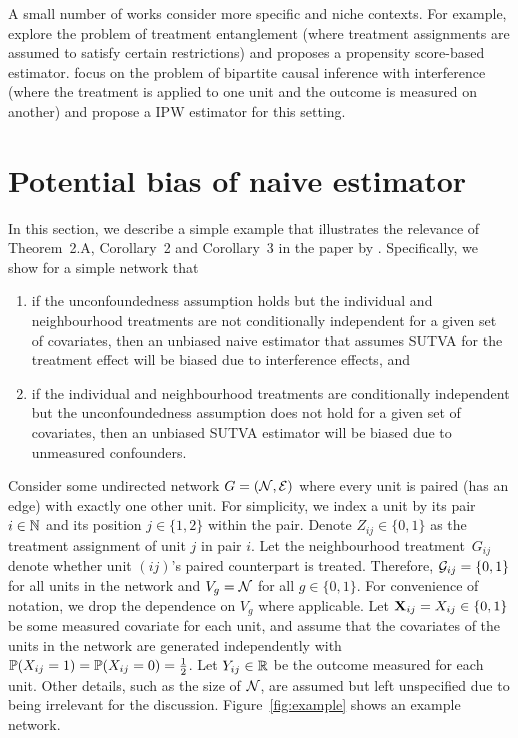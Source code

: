 \documentclass[10pt]{article}
\begin{document}
A small number of works consider more specific and niche contexts. For example, \textcite{Toulis:2018} explore the problem of treatment entanglement (where treatment assignments are assumed to satisfy certain restrictions) and proposes a propensity score-based estimator. \textcite{Zigler:2021} focus on the problem of bipartite causal inference with interference (where the treatment is applied to one unit and the outcome is measured on another) and propose a IPW estimator for this setting.



\section{Potential bias of naive estimator}\label{sec:example}

In this section, we describe a simple example that illustrates the relevance of Theorem~2.A, Corollary~2 and Corollary~3 in the paper by \textcite{Forastiere:2021}. Specifically, we show for a simple network that
\begin{enumerate}

\item
if the unconfoundedness assumption holds but the individual and neighbourhood treatments are not conditionally independent for a given set of covariates, then an unbiased naive estimator that assumes SUTVA for the treatment effect will be biased due to interference effects, and

\item
if the individual and neighbourhood treatments are conditionally independent but the unconfoundedness assumption does not hold for a given set of covariates, then an unbiased SUTVA estimator will be biased due to unmeasured confounders.

\end{enumerate}

Consider some undirected network $G=(\calN,\calE)$ where every unit is paired (has an edge) with exactly one other unit. For simplicity, we index a unit by its pair $i\in\bbN$ and its position $j\in\{1,2\}$ within the pair. Denote $Z_{ij}\in\{0,1\}$ as the treatment assignment of unit $j$ in pair $i$. Let the neighbourhood treatment~$G_{ij}$ denote whether unit $(ij)$'s paired counterpart is treated. Therefore, $\calG_{ij}=\{0,1\}$ for all units in the network and $V_g=\calN$ for all $g\in\{0,1\}$. For convenience of notation, we drop the dependence on $V_g$ where applicable. Let $\bfX_{ij}=X_{ij}\in\{0,1\}$ be some measured covariate for each unit, and assume that the covariates of the units in the network are generated independently with $\P(X_{ij}=1)=\P(X_{ij}=0)=\frac{1}{2}$. Let $Y_{ij}\in\bbR$ be the outcome measured for each unit. Other details, such as the size of $\calN$, are assumed but left unspecified due to being irrelevant for the discussion. Figure~\ref{fig:example} shows an example network.
\\
\end{document}
